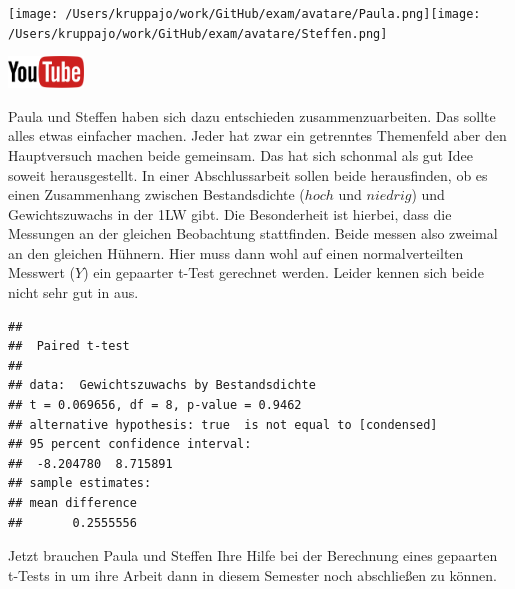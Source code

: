 \documentclass[a4paper, 9pt]{scrartcl}\usepackage[]{graphicx}\usepackage[]{xcolor}
\makeatletter
\newenvironment{kframe}{%
 \def\at@end@of@kframe{}%
 \ifinner\ifhmode%
  \def\at@end@of@kframe{\end{minipage}}%
  \begin{minipage}{\columnwidth}%
 \fi\fi%
 \def\FrameCommand##1{\hskip\@totalleftmargin \hskip-\fboxsep
 \colorbox{shadecolor}{##1}\hskip-\fboxsep
     \hskip-\linewidth \hskip-\@totalleftmargin \hskip\columnwidth}%
 \MakeFramed {\advance\hsize-\width
   \@totalleftmargin\z@ \linewidth\hsize
   \@setminipage}}%
 {\par\unskip\endMakeFramed%
 \at@end@of@kframe}
\newenvironment{knitrout}{}{} %
\makeatother
\begin{document}
 
\begin{minipage}[t]{0.5\textwidth}
\texttt{[image: /Users/kruppajo/work/GitHub/exam/avatare/Paula.png]}\hspace{-4mm}\texttt{[image: /Users/kruppajo/work/GitHub/exam/avatare/Steffen.png]}
\end{minipage}
\begin{minipage}[t]{0.5\textwidth}
\hfill
\href{https://youtu.be/kHmfEmU6lrk}{\includegraphics[width = 2cm]{img/youtube}}
\end{minipage}
\vspace{1ex}



Paula und Steffen haben sich dazu entschieden zusammenzuarbeiten. Das sollte alles etwas einfacher machen. Jeder hat zwar ein getrenntes Themenfeld aber den Hauptversuch machen beide gemeinsam. Das hat sich schonmal als gut Idee soweit herausgestellt. In einer Abschlussarbeit sollen beide herausfinden, ob es einen Zusammenhang zwischen Bestandsdichte ($hoch$ und $niedrig$) und Gewichtszuwachs in der 1LW gibt. Die Besonderheit ist hierbei, dass die Messungen an der gleichen Beobachtung stattfinden. Beide messen also zweimal an den gleichen Hühnern. Hier muss dann wohl auf einen normalverteilten Messwert ($Y$) ein gepaarter t-Test gerechnet werden. Leider kennen sich beide nicht sehr gut in \Rlogo aus.

\begin{knitrout}
\color{fgcolor}\begin{kframe}
\begin{verbatim}
## 
## 	Paired t-test
## 
## data:  Gewichtszuwachs by Bestandsdichte
## t = 0.069656, df = 8, p-value = 0.9462
## alternative hypothesis: true  is not equal to [condensed]
## 95 percent confidence interval:
##  -8.204780  8.715891
## sample estimates:
## mean difference 
##       0.2555556
\end{verbatim}
\end{kframe}
\end{knitrout}

Jetzt brauchen Paula und Steffen Ihre Hilfe bei der Berechnung eines gepaarten t-Tests in \Rlogo um ihre Arbeit dann in diesem Semester noch abschließen zu können.
\end{document}

